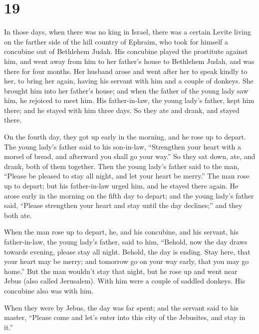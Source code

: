 \hypertarget{section-18}{%
\section{19}\label{section-18}}

 In those days, when there was no king in Israel, there
was a certain Levite living on the farther side of the hill country of
Ephraim, who took for himself a concubine out of Bethlehem Judah.
 His concubine played the prostitute against him, and went
away from him to her father's house to Bethlehem Judah, and was there
for four months.  Her husband arose and went after her to
speak kindly to her, to bring her again, having his servant with him and
a couple of donkeys. She brought him into her father's house; and when
the father of the young lady saw him, he rejoiced to meet him.
 His father-in-law, the young lady's father, kept him
there; and he stayed with him three days. So they ate and drank, and
stayed there.

 On the fourth day, they got up early in the morning, and
he rose up to depart. The young lady's father said to his son-in-law,
``Strengthen your heart with a morsel of bread, and afterward you shall
go your way.''  So they sat down, ate, and drank, both of
them together. Then the young lady's father said to the man, ``Please be
pleased to stay all night, and let your heart be merry.'' 
The man rose up to depart; but his father-in-law urged him, and he
stayed there again.  He arose early in the morning on the
fifth day to depart; and the young lady's father said, ``Please
strengthen your heart and stay until the day declines;'' and they both
ate.

 When the man rose up to depart, he, and his concubine,
and his servant, his father-in-law, the young lady's father, said to
him, ``Behold, now the day draws towards evening, please stay all night.
Behold, the day is ending. Stay here, that your heart may be merry; and
tomorrow go on your way early, that you may go home.'' 
But the man wouldn't stay that night, but he rose up and went near Jebus
(also called Jerusalem). With him were a couple of saddled donkeys. His
concubine also was with him.

 When they were by Jebus, the day was far spent; and the
servant said to his master, ``Please come and let's enter into this city
of the Jebusites, and stay in it.''

